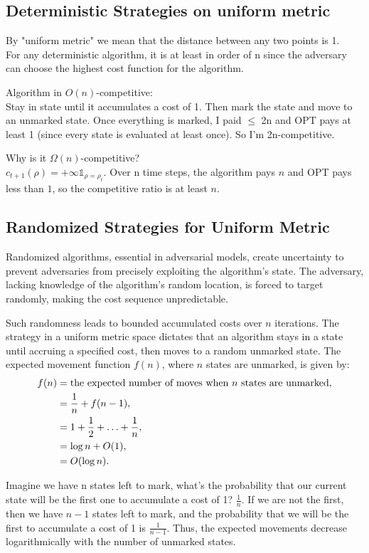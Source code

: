 \documentclass[11pt]{book} %
\begin{document}
\subsection{Deterministic Strategies on uniform metric}

By "uniform metric" we mean that the distance between any two points is 1. \\
For any deterministic algorithm, it is at least in order of n since the adversary can choose the highest cost function for the algorithm.

Algorithm in $O(n)$-competitive: \\
Stay in state until it accumulates a cost of 1. 
Then mark the state and move to an unmarked state. 
Once everything is marked, I paid $\leq$ 2n and OPT pays at least 1 (since every state is evaluated at least once). So I'm 2n-competitive.

Why is it $\Omega(n)$-competitive? \\
$c_{t+1}(\rho) = +\infty \mathds{1}_{\rho = \rho_t}$.
Over n time steps, the algorithm pays $n$ and OPT pays less than $1$, so the competitive ratio is at least $n$.


\subsection{Randomized Strategies for Uniform Metric}
Randomized algorithms, essential in adversarial models, create uncertainty to prevent adversaries from precisely exploiting the algorithm's state. 
The adversary, lacking knowledge of the algorithm's random location, is forced to target randomly, making the cost sequence unpredictable.

Such randomness leads to bounded accumulated costs over \( n \) iterations. 
The strategy in a uniform metric space dictates that an algorithm stays in a state until accruing a specified cost, 
then moves to a random unmarked state. The expected movement function \( f(n) \), where \( n \) states are unmarked, is given by:
\begin{align*}
f(n) &= \text{the expected number of moves when \( n \) states are unmarked}, \\
&= \frac{1}{n} + f(n-1), \\
&= 1 + \frac{1}{2} + \ldots + \frac{1}{n}, \\
&= \log n + O(1), \\
&= O(\log n).
\end{align*}

Imagine we have n states left to mark, what's the probability that our current state will be the first one to accumulate a cost of 1? $\frac{1}{n}$.
If we are not the first, then we have $n-1$ states left to mark, and the probability that we will be the first to accumulate a cost of 1 is $\frac{1}{n-1}$.
Thus, the expected movements decrease logarithmically with the number of unmarked states. 
\end{document}
